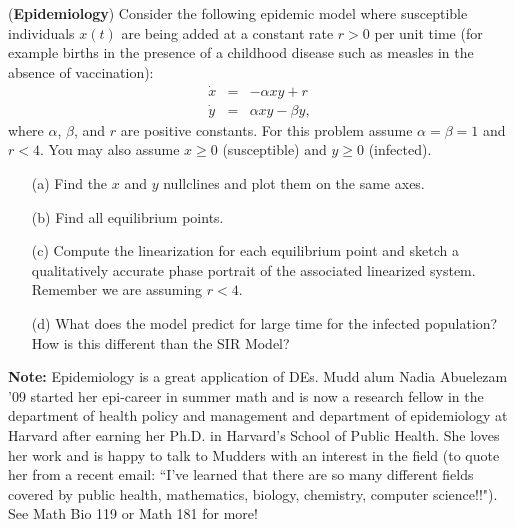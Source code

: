 \documentclass[11pt,letterpaper,boxed]{hmcpset}
\begin{document}
\begin{problem}[4.] (\textbf{Epidemiology})
Consider the following epidemic model where  susceptible individuals $x(t)$ are being added at
a constant rate $r > 0$ per unit time (for example  births in the presence of a childhood
disease such as measles in the absence of vaccination):
\begin{eqnarray*}
\dot{x} & = & -\alpha x y + r \\
\dot{y} & = & \alpha x y - \beta y,
\end{eqnarray*}
where  $\alpha$, $\beta$, and $r$ are positive constants. For this problem assume
$\alpha = \beta = 1$ and  $r < 4$.  You may also assume $x \geq 0$ (susceptible) and $y \geq 0$ (infected).  
\begin{enumerate}
\item[(a)] Find the $x$ and $y$ nullclines and plot them on the same axes.   
\item[(b)]  Find all equilibrium points.  
\item[(c)] Compute the linearization for each equilibrium point and sketch a qualitatively accurate
phase portrait of the associated linearized system.   Remember we are
assuming $ r< 4$.    
\item[(d)] What does the model predict for large time for the infected population? How is this different than the SIR Model?
\end{enumerate}
\bigskip
\noindent
\textbf{Note:} Epidemiology is a great application of DEs. Mudd alum Nadia Abuelezam '09 started her epi-career in summer math and  is now a research fellow in the department of health policy and management and department of epidemiology at Harvard after earning her Ph.D. in Harvard's School of Public Health. She loves her work and is happy to talk to Mudders with an interest in the field (to quote her from a recent email:  ``I've learned that there are so many different fields covered by public health, mathematics, biology, chemistry, computer science!!"). See Math Bio 119 or Math 181 for more!
\end{problem}

\begin{solution}
\vfill
\end{solution}
\newpage
\end{document}
